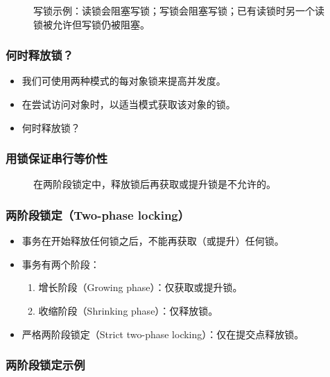 \begin{figure}[H]
  \centering
  \caption{写锁示例：读锁会阻塞写锁；写锁会阻塞写锁；已有读锁时另一个读锁被允许但写锁仍被阻塞。}
\end{figure}

\subsubsection{何时释放锁？}

\begin{itemize}
  \item 我们可使用两种模式的每对象锁来提高并发度。
  \item 在尝试访问对象时，以适当模式获取该对象的锁。
  \item 何时释放锁？
\end{itemize}

\subsubsection{用锁保证串行等价性}

\begin{figure}[H]
  \centering
  \caption{在两阶段锁定中，释放锁后再获取或提升锁是不允许的。}
\end{figure}

\subsubsection{两阶段锁定（Two-phase locking）}

\begin{itemize}
  \item 事务在开始释放任何锁之后，不能再获取（或提升）任何锁。
  \item 事务有两个阶段：
  \begin{enumerate}
    \item 增长阶段（Growing phase）：仅获取或提升锁。
    \item 收缩阶段（Shrinking phase）：仅释放锁。
  \end{enumerate}
  \item 严格两阶段锁定（Strict two-phase locking）：仅在提交点释放锁。
\end{itemize}

\subsubsection{两阶段锁定示例}

